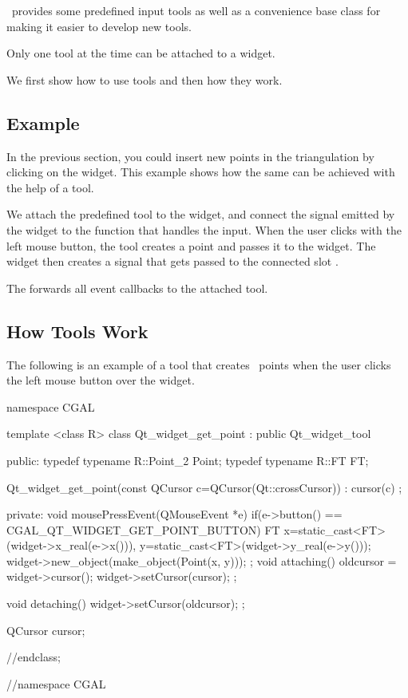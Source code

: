 \cgal\ provides some predefined input tools as well as a convenience base class 
 for making it easier to develop new tools.

Only one tool at the time can be attached to a widget.

We first show how to use tools and then how they work.

\subsection{Example}

In the previous section, you could insert new points in the
triangulation by clicking on the widget. This example shows how
the same can be achieved with the help of a tool.

We attach the predefined tool  to the widget,
and connect the signal emitted by the widget to the function that
handles the input.  When the user clicks with the left mouse button,
the tool creates a point and passes it to the widget. The widget then
creates a signal that gets passed to the connected slot
.


The  forwards all event callbacks to the attached tool.


\subsection{How Tools Work}

The following is an example of a tool that creates \cgal\ points when the user 
clicks the left mouse button over the widget. 
 
\begin{ccExampleCode}
namespace CGAL {

template <class R>
class Qt_widget_get_point : public Qt_widget_tool
{
public:
  typedef typename R::Point_2   Point;
  typedef typename R::FT        FT;
  
  Qt_widget_get_point(const QCursor c=QCursor(Qt::crossCursor)) :
    cursor(c) {};
  
private:
  void mousePressEvent(QMouseEvent *e)
  {
    if(e->button() == CGAL_QT_WIDGET_GET_POINT_BUTTON)
    {
      FT
        x=static_cast<FT>(widget->x_real(e->x())),
        y=static_cast<FT>(widget->y_real(e->y()));
      widget->new_object(make_object(Point(x, y)));
    }
  };
  void attaching()
  {
    oldcursor = widget->cursor();
    widget->setCursor(cursor);
  };
  
  void detaching()
  {
    widget->setCursor(oldcursor);
  };

  QCursor cursor;
}//endclass;
}//namespace CGAL
\end{ccExampleCode}

